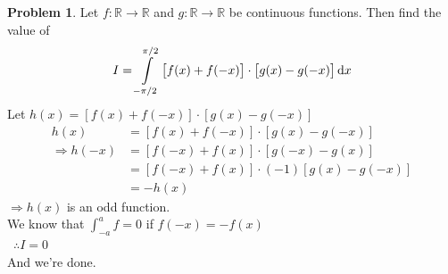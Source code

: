 \documentclass[14]{article}
\theoremstyle{definition}
\newtheorem{prob}{Problem}
\theoremstyle{case}
\begin{document}
\begin{prob}
Let $f: \mathbb{R} \to \mathbb{R}$ and $g:\mathbb{R} \to \mathbb{R}$ be continuous functions. Then find the value of
\[ I = \int\limits_{-\pi/2}^{\pi/2} \left[ f(x) + f(-x) \right] \cdot \left[ g(x) - g(-x) \right] \dif x \]
Let $h(x) = \left[ f(x) + f(-x) \right] \cdot \left[ g(x) - g(-x) \right]$\\
\begin{align*}
h(x) &= \left[ f(x) + f(-x) \right] \cdot \left[ g(x) - g(-x) \right]\\
\Rightarrow h(-x) &= \left[ f(-x) + f(x) \right] \cdot \left[ g(-x) - g(x) \right]\\
&= \left[ f(-x) + f(x) \right] \cdot (-1) \left[ g(x) - g(-x) \right]\\
&= -h(x)
\end{align*}
$\Rightarrow h(x)$ is an odd function.\\
We know that $\displaystyle\int_{-a}^a f = 0$ if $f(-x) = -f(x)$\\\
$\therefore I = 0$\\
And we're done.
\end{prob}
\pagebreak
\end{document}
